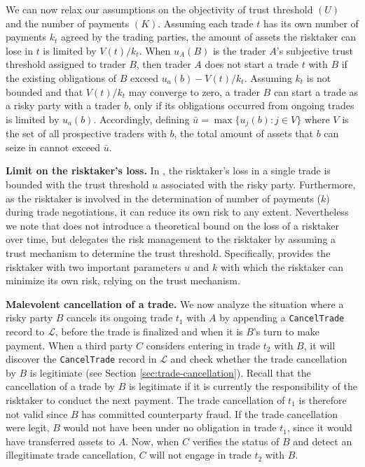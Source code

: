 We can now relax our assumptions on the objectivity of trust threshold $ (U) $ and the number of payments $ (K) $.
Assuming each trade $ t $ has its own number of payments $ k_t $ agreed by the trading parties, the amount of assets the risktaker can lose in $ t $ is limited by $ V(t)/k_t $.
When $ u_A(B) $ is the trader $ A $'s subjective trust threshold assigned to trader $ B $, then trader $ A $ does not start a trade $ t $ with $ B $ if the existing obligations of $ B $ exceed $ u_a(b) - V(t)/k_t $.
Assuming $ k_t $ is not bounded and that $ V(t)/k_t $ may converge to zero, a trader $ B $ can start a trade as a risky party with a trader $ b $, only if its obligations occurred from ongoing trades is limited by $ u_a(b) $.
Accordingly, defining $ \bar{u} = \max\{u_j(b) : j\in V\} $ where $ V $ is the set of all prospective traders with $ b $, the total amount of assets that $ b $ can seize in \ModelName{} cannot exceed $ \bar{u} $.

\textbf{Limit on the risktaker's loss.} 
In \ModelName{}, the risktaker's loss in a single trade is bounded with the trust threshold $ u $ associated with the risky party.
Furthermore, as the risktaker is involved in the determination of number of payments ($ k $) during trade negotiations, it can reduce its own risk to any extent.
Nevertheless we note that \ModelName{} does not introduce a theoretical bound on the loss of a risktaker over time, but delegates the risk management to the risktaker by assuming a trust mechanism to determine the trust threshold.
Specifically, \ModelName{} provides the risktaker with two important parameters $ u $ and $ k $ with which the risktaker can minimize its own risk, relying on the trust mechanism.

\textbf{Malevolent cancellation of a trade.} 
We now analyze the situation where a risky party $ B $ cancels its ongoing trade $ t_1 $ with $ A $ by appending a \texttt{CancelTrade} record to $ \mathcal{L} $, before the trade is finalized and when it is $ B $'s turn to make payment.
When a third party $ C $ considers entering in trade $ t_2 $ with $ B $, it will discover the \texttt{CancelTrade} record in $ \mathcal{L} $ and check whether the trade cancellation by $ B $ is legitimate (see Section \ref{sec:trade-cancellation}).
Recall that the cancellation of a trade by $ B $ is legitimate if it is currently the responsibility of the risktaker to conduct the next payment.
The trade cancellation of $ t_1 $ is therefore not valid since $ B $ has committed counterparty fraud.
If the trade cancellation were legit, $ B $ would not have been under no obligation in trade $ t_1 $, since it would have transferred assets to $ A $.
Now, when $ C $ verifies the status of $ B $ and detect an illegitimate trade cancellation, $ C $ will not engage in trade $ t_2 $ with $ B $.

